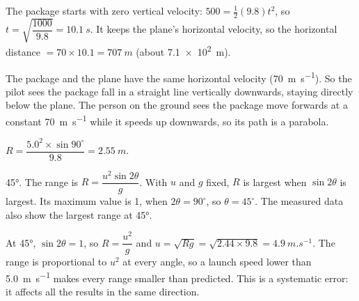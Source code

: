 \documentclass[12pt]{article}
\begin{document}
\ansq
{}
\begin{crit}
\end{crit}
\sample
The package starts with zero vertical velocity: $500 = \frac{1}{2}(9.8)t^2$, so
$t = \sqrt{\dfrac{1000}{9.8}} = \qty{10.1}{s}$. It keeps the plane's horizontal velocity, so the
horizontal distance $= 70 \times 10.1 = \qty{707}{m}$ (about \qty{7.1e2}{m}).
\begin{crit}
\end{crit}
\sample
The package and the plane have the same horizontal velocity (\qty{70}{m.s^{-1}}). So the pilot sees
the package fall in a straight line vertically downwards, staying directly below the plane. The
person on the ground sees the package move forwards at a constant \qty{70}{m.s^{-1}} while it speeds
up downwards, so its path is a parabola.

\ansq
{}
\begin{crit}
\end{crit}
\sample
$R = \dfrac{5.0^2 \times \sin 90^\circ}{9.8} = \qty{2.55}{m}$.
\begin{crit}
\end{crit}
\sample
\ang{45}. The range is $R = \dfrac{u^2\sin 2\theta}{g}$. With $u$ and $g$ fixed, $R$ is largest when
$\sin 2\theta$ is largest. Its maximum value is 1, when $2\theta = 90^\circ$, so $\theta = 45^\circ$.
The measured data also show the largest range at \ang{45}.
\begin{crit}
\end{crit}
\sample
At \ang{45}, $\sin 2\theta = 1$, so $R = \dfrac{u^2}{g}$ and $u = \sqrt{Rg} = \sqrt{2.44 \times 9.8} =
\qty{4.9}{m.s^{-1}}$. The range is proportional to $u^2$ at every angle, so a launch speed lower than
\qty{5.0}{m.s^{-1}} makes every range smaller than predicted. This is a systematic error: it affects all
the results in the same direction.
\end{document}
